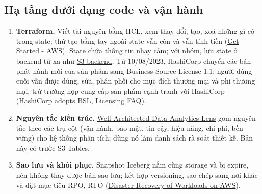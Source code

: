 \subsection{Hạ tầng dưới dạng code và vận hành}
\begin{enumerate}[resume]
  \item \textbf{Terraform.} Viết tài nguyên bằng HCL,  xem thay đổi,  tạo,  xoá những gì có trong state; thứ tạo bằng tay ngoài state vẫn còn và vẫn tính tiền (\href{https://developer.hashicorp.com/terraform/tutorials/aws-get-started}{Get Started - AWS}). State chứa thông tin nhạy cảm; với nhóm, lưu state ở backend từ xa như \href{https://developer.hashicorp.com/terraform/language/backend/s3}{S3 backend}. Từ 10/08/2023, HashiCorp chuyển các bản phát hành mới của sản phẩm sang Business Source License 1.1; người dùng cuối vẫn được dùng, sửa, phân phối cho mục đích thương mại và phi thương mại, trừ trường hợp cung cấp sản phẩm cạnh tranh với HashiCorp (\href{https://www.hashicorp.com/en/blog/hashicorp-adopts-business-source-license}{HashiCorp adopts BSL}, \href{https://www.hashicorp.com/en/license-faq}{Licensing FAQ}).
  \item \textbf{Nguyên tắc kiến trúc.} \href{https://docs.aws.amazon.com/wellarchitected/latest/analytics-lens/analytics-lens.html}{Well-Architected Data Analytics Lens} gom nguyên tắc theo các trụ cột (vận hành, bảo mật, tin cậy, hiệu năng, chi phí, bền vững) cho hệ thống phân tích; dùng nó làm danh sách rà soát thiết kế. Bản này có trước S3 Tables.
  \item \textbf{Sao lưu và khôi phục.} Snapshot Iceberg nằm cùng storage và bị expire, nên không thay được bản sao lưu; kết hợp versioning, sao chép sang nơi khác và đặt mục tiêu RPO, RTO (\href{https://docs.aws.amazon.com/whitepapers/latest/disaster-recovery-workloads-on-aws/disaster-recovery-workloads-on-aws.html}{Disaster Recovery of Workloads on AWS}).
\end{enumerate}

